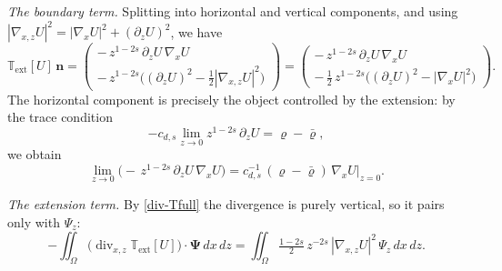 \documentclass[12pt,a4paper,twoside]{article}
\newcommand{\Div}{\operatorname{div}}
\newcommand{\vr}{\varrho}
\newcommand{\Grad}{\nabla}
\numberwithin{equation}{section}%
\begin{document}
\medskip
\noindent\emph{The boundary term.} Splitting into horizontal and vertical components, and using $|\Grad_{x,z}U|^2 = |\Grad_x U|^2 + (\partial_z U)^2$, we have
\begin{equation}\label{Tn}
	\mathbb{T}_{\mathrm{ext}}[U]\,\mathbf{n}
	= \begin{pmatrix}
		-\, z^{1-2s}\, \partial_z U\, \Grad_x U \\[4pt]
		-\, z^{1-2s} \Big( (\partial_z U)^2 - \tfrac12 |\Grad_{x,z} U|^2 \Big)
	\end{pmatrix}
	= \begin{pmatrix}
		-\, z^{1-2s}\, \partial_z U\, \Grad_x U \\[4pt]
		-\, \tfrac12\, z^{1-2s} \Big( (\partial_z U)^2 - |\Grad_x U|^2 \Big)
	\end{pmatrix}.
\end{equation}
The horizontal component is precisely the object controlled by the extension: by the trace condition
\[
-c_{d,s} \lim_{z\to0} z^{1-2s}\, \partial_z U = \vr - \bar\vr,
\]
we obtain
\begin{equation*}
	\lim_{z\to0} \Big( -\, z^{1-2s}\, \partial_z U\, \Grad_x U \Big)
	= c_{d,s}^{-1}\, (\vr - \bar\vr)\, \Grad_x U|_{z=0} .
\end{equation*}

\medskip
\noindent\emph{The extension term.} By \eqref{div-Tfull} the divergence is purely vertical, so it pairs only with $\Psi_z$:
\begin{equation}\label{bulk-term}
	- \iint_{\Omega} \big( \Div_{x,z}\mathbb{T}_{\mathrm{ext}}[U] \big)\cdot\pmb{\Psi}\,dx\,dz
	= \iint_{\Omega} \tfrac{1-2s}{2}\, z^{-2s}\, |\Grad_{x,z} U|^2\, \Psi_z \,dx\,dz .
\end{equation}
\end{document}
